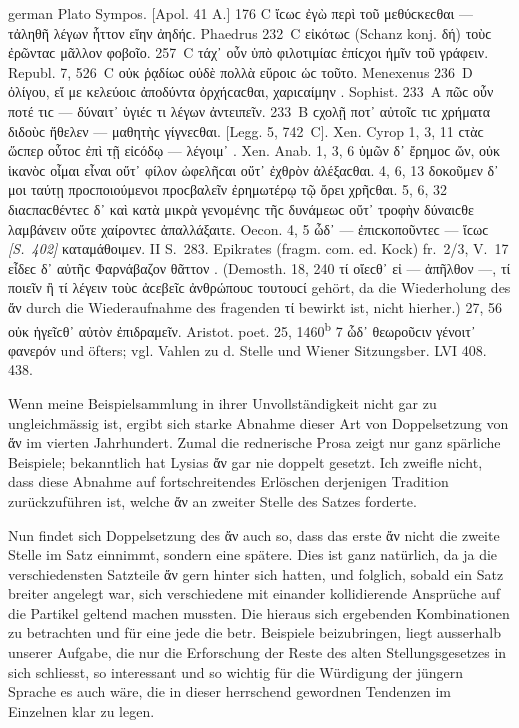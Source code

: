 \begin{otherlanguage*}{german}
Plato Sympos. [Apol. 41 Α.] 176 C ἴϲωϲ  ἐγὼ περὶ τοῦ μεθύϲκεϲθαι — τἀληθῆ λέγων ἧττον  εἴην ἀηδήϲ. Phaedrus 232~C εἰκότωϲ  (Schanz konj. δή) τοὺϲ ἐρῶνταϲ μᾶλλον  φοβοῖο. 257~C τάχ᾽ οὖν  ὑπὸ φιλοτιμίαϲ ἐπίϲχοι ἡμῖν  τοῦ γράφειν. Republ. 7, 526~C οὐκ  ῥᾳδίωϲ οὐδὲ πολλὰ  εὕροιϲ ὡϲ τοῦτο. Menexenus 236~D  ὀλίγου, εἴ με κελεύοιϲ ἀποδύντα ὀρχήϲαϲθαι, χαριϲαίμην . Sophist. 233~A πῶϲ οὖν  ποτέ τιϲ — δύναιτ᾽  ὑγιέϲ τι λέγων ἀντειπεῖν. 233~Β ϲχολῇ ποτ᾽  αὐτοῖϲ τιϲ χρήματα διδοὺϲ ἤθελεν  — μαθητὴϲ γίγνεϲθαι. [Legg. 5, 742~C]. Xen. Cyrop 1, 3, 11 ϲτὰϲ  ὥϲπερ οὗτοϲ ἐπὶ τῇ εἰϲόδῳ — λέγοιμ᾽ . Xen. Anab. 1, 3, 6 ὑμῶν δ᾽ ἔρημοϲ ὤν, οὐκ  ἱκανὸϲ οἶμαι εἶναι οὔτ᾽  φίλον ὠφελῆϲαι οὔτ᾽  ἐχθρὸν ἀλέξαϲθαι. 4, 6, 13 δοκοῦμεν δ᾽  μοι ταύτῃ προϲποιούμενοι προϲβαλεῖν ἐρημωτέρῳ  τῷ ὄρει χρῆϲθαι. 5, 6, 32 διαϲ\-παϲθέν\-τεϲ δ᾽  καὶ κατὰ μικρὰ γενομένηϲ τῆϲ δυνάμεωϲ οὔτ᾽  τροφὴν δύναιϲθε λαμβάνειν οὔτε χαίροντεϲ  ἀπαλλάξαιτε. Oecon. 4, 5 ὦδ᾽  — ἐπιϲκοποῦντεϲ — ἴϲωϲ   \hypertarget{p402}{\emph{[S.~402]}}\label{p402} καταμάθοιμεν. II S.~283. Epikrates (fragm. com. ed. Kock) fr.~2/3, V.~17 εἶδεϲ δ᾽  αὐτῆϲ Φαρνάβαζον θᾶττον . (Demosth. 18, 240 τί  οἴεϲθ᾽ εἰ — ἀπῆλθον —, τί ποιεῖν  ἢ τί λέγειν τοὺϲ ἀϲεβεῖϲ ἀνθρώπουϲ τουτουϲί gehört, da die Wiederholung des ἄν durch die Wiederaufnahme des fragenden τί bewirkt ist, nicht hierher.) 27, 56 οὐκ  ἡγεῖϲθ᾽ αὐτὸν  ἐπιδραμεῖν. Aristot. poet. 25, 1460\textsuperscript{b} 7 ὧδ᾽  θεωροῦϲιν γένοιτ᾽  φανερόν und öfters; vgl. Vahlen zu d. Stelle und Wiener Sitzungsber. LVI 408. 438.

Wenn meine Beispielsammlung in ihrer Unvollständigkeit nicht gar zu ungleichmässig ist, ergibt sich starke Abnahme dieser Art von Doppelsetzung von ἄν im vierten Jahrhundert. Zumal die rednerische Prosa zeigt nur ganz spärliche Beispiele; bekanntlich hat Lysias ἄν gar nie doppelt gesetzt. Ich zweifle nicht, dass diese Abnahme auf fortschreitendes Erlöschen derjenigen Tradition zurückzuführen ist, welche ἄν an zweiter Stelle des Satzes forderte.

Nun findet sich Doppelsetzung des ἄν auch so, dass das erste ἄν nicht die zweite Stelle im Satz einnimmt, sondern eine spätere. Dies ist ganz natürlich, da ja die verschiedensten Satzteile ἄν gern hinter sich hatten, und folglich, sobald ein Satz breiter angelegt war, sich verschiedene mit einander kollidierende Ansprüche auf die Partikel geltend machen mussten. Die hieraus sich ergebenden Kombinationen zu betrachten und für eine jede die betr. Beispiele beizubringen, liegt ausserhalb unserer Aufgabe, die nur die Erforschung der Reste des alten Stellungsgesetzes in sich schliesst, so interessant und so wichtig für die Würdigung der jüngern Sprache es auch wäre, die in dieser herrschend gewordnen Tendenzen im Einzelnen klar zu legen.


\end{otherlanguage*}
